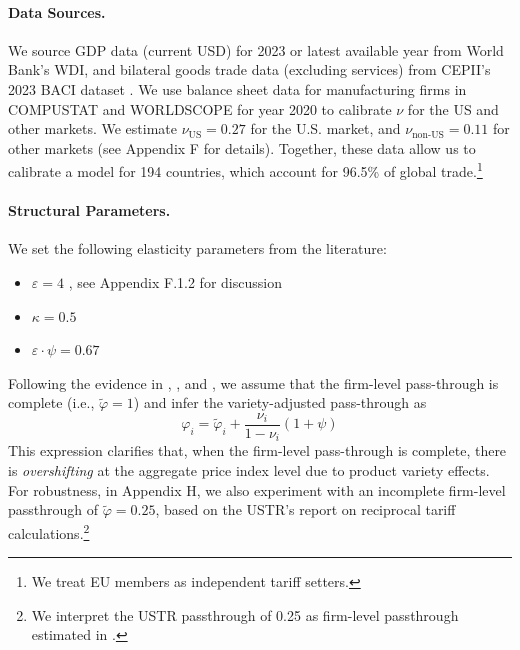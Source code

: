 \documentclass[12pt]{article}
\begin{document}
\paragraph{Data Sources.}
We source GDP data (current USD) for 2023 or latest available year from World Bank's WDI, and bilateral goods trade data (excluding services) from CEPII's 2023 BACI dataset \citep{Baci}. We use balance sheet data for manufacturing firms in COMPUSTAT and WORLDSCOPE for year 2020 to calibrate $\nu$ for the US and other markets. We estimate $\nu_{\text{US}}=0.27$ for the U.S. market, and $\nu_{\text{non-US}}=0.11$ for other markets (see Appendix F for details). Together, these data allow us to calibrate a model for 194 countries, which account for 96.5\% of global trade.\footnote{We treat EU members as independent tariff setters.} 



\paragraph{Structural Parameters.}
We set the following elasticity parameters from the literature:
\begin{itemize}
    \item $\varepsilon = 4$  \citep{simonovska2014elasticity,
    NBERw20495}, see Appendix F.1.2 for discussion 
    \item $\kappa =0.5$  \citep{chetty2011micro}
    \item $\varepsilon\cdot \psi = 0.67$  \citep{lashkaripour2023profits}  
\end{itemize}
Following the evidence in \cite{amiti2019impact}, \cite{cavallo2021tariff}, and \cite{fajgelbaum2020return}, we assume that the firm-level pass-through is complete (i.e., $\tilde{\varphi}=1$) and infer the variety-adjusted pass-through as
\[
\varphi_{i} = \tilde{\varphi}_{i}+\frac{\nu_{i}}{1-\nu_{i}}(1+\psi)
\]
This expression clarifies that, when the firm-level pass-through is complete, there is \textit{overshifting} at the aggregate price index level due to product variety effects.  For robustness, in Appendix H, we also experiment with an incomplete firm-level passthrough of $\tilde{\varphi} =0.25$, based on the USTR's report on reciprocal tariff calculations.\footnote{We interpret the USTR passthrough of 0.25 as firm-level passthrough estimated in \cite{cavallo2021tariff}.}
\end{document}
